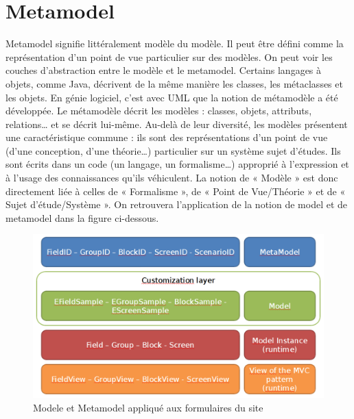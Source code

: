 \section{Metamodel}
Metamodel signifie littéralement modèle du modèle. Il peut être défini comme la représentation d'un point de vue particulier sur des modèles. On peut voir les couches d'abstraction entre le modèle et le metamodel. Certains langages à objets, comme Java, décrivent de la même manière les classes, les métaclasses et les objets. En génie logiciel, c'est avec UML que la notion de métamodèle a été développée. Le métamodèle décrit les modèles : classes, objets, attributs, relations… et se décrit lui-même. Au-delà de leur diversité, les modèles présentent une caractéristique commune : ils sont des représentations d’un point de vue (d'une conception, d'une théorie…) particulier sur un système sujet d’études. Ils sont écrits dans un code (un langage, un formalisme…) approprié à l'expression et à l'usage des connaissances qu'ils véhiculent.
La notion de « Modèle » est donc directement liée à celles de « Formalisme », de « Point de Vue/Théorie » et de « Sujet d'étude/Système ». On retrouvera l'application de la notion de model et de metamodel dans la figure ci-dessous.
\begin{figure}[!h]
\centering
\includegraphics[width=15cm]{sujet/metamodel.png}
\caption{Modele et Metamodel appliqué aux formulaires du site}
\end{figure}

